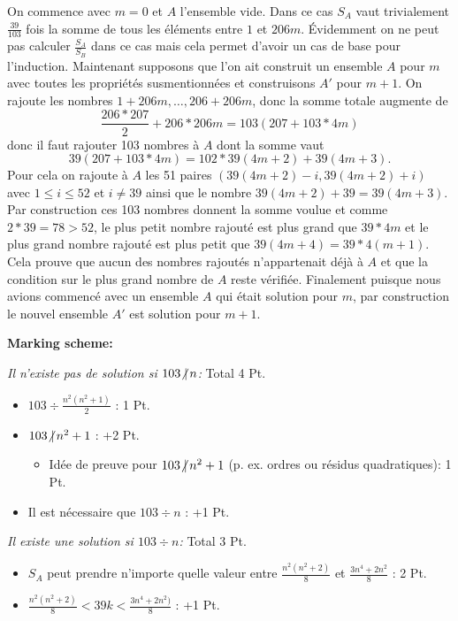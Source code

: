 \documentclass[language=german,style=solution]{smo}
\begin{document}
\begin{enumerate}
On commence avec $m=0$ et $A$ l'ensemble vide. Dans ce cas $S_A$ vaut trivialement $\frac{39}{103}$ fois la somme de tous les éléments entre $1$ et $206m$. Évidemment on ne peut pas calculer $\frac{S_A}{S_B}$ dans ce cas mais cela permet d'avoir un cas de base pour l'induction. Maintenant supposons que l'on ait construit un ensemble $A$ pour $m$ avec toutes les propriétés susmentionnées et construisons $A'$ pour $m+1$. On rajoute les nombres $1+206m, \ldots, 206 + 206m$, donc la somme totale augmente de
\[
	\frac{206*207}{2} + 206*206m = 103(207 + 103*4m)
\]
donc il faut rajouter 103 nombres à $A$ dont la somme vaut 
\[
	39(207 + 103*4m) = 102*39(4m+2) + 39(4m+3).
\]
Pour cela on rajoute à $A$ les 51 paires $(39(4m+2)-i, 39(4m+2)+i)$ avec $1\leq i\leq 52$ et $i\neq 39$ ainsi que le nombre $39(4m+2)+39 = 39(4m+3)$. Par construction ces 103 nombres donnent la somme voulue et comme $2*39 = 78 > 52$, le plus petit nombre rajouté est plus grand que $39*4m$ et le plus grand nombre rajouté est plus petit que $39(4m+4) = 39*4(m+1)$. Cela prouve que aucun des nombres rajoutés n'appartenait déjà à $A$ et que la condition sur le plus grand nombre de $A$ reste vérifiée. Finalement puisque nous avions commencé avec un ensemble $A$ qui était solution pour $m$, par construction le nouvel ensemble $A'$ est solution pour $m+1$.

\textbf{Marking scheme:}

\textit{Il n'existe pas de solution si $103\ndiv n$:} Total 4 Pt.
\begin{itemize}
	\item $103 \div \frac{n^2(n^2+1)}{2}$ : 1 Pt.
	\item $103 \ndiv n^2+1$ : +2 Pt.
	\begin{itemize}
		\item Idée de preuve pour $103 \ndiv n^2+1$ (p. ex. ordres ou résidus quadratiques): 1 Pt.
	\end{itemize}
	\item Il est nécessaire que $103 \div n$ : +1 Pt.
\end{itemize}

\textit{Il existe une solution si $103\div n$:} Total 3 Pt.
\begin{itemize}
	\item $S_A$ peut prendre n'importe quelle valeur entre $\frac{n^2(n^2+2)}{8}$ et $\frac{3n^4+2n^2}{8}$ : 2 Pt.
	\item $\frac{n^2(n^2+2)}{8} < 39k < \frac{3n^4+2n^2)}{8}$ : +1 Pt.
\end{itemize}


\end{enumerate}
\end{document}

